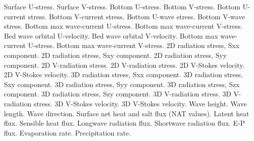 \begin{klist}
\begin{klist}
          Surface U-stress.
          Surface V-stress.
          Bottom U-stress.
          Bottom V-stress.
\vspace{2 mm}
          Bottom U-current stress.
          Bottom V-current stress.
          Bottom U-wave stress.
          Bottom V-wave stress.
          Bottom max wave-current U-stress.
          Bottom max wave-current V-stress.
\vspace{2 mm}
          Bed wave orbital U-velocity.
          Bed wave orbital V-velocity.
          Bottom max wave-current U-stress.
          Bottom max wave-current V-stress.
\vspace{2 mm}
         2D radiation stress, Sxx component.
         2D radiation stress, Sxy component.
         2D radiation stress, Syy component.
         2D V-radiation stress.
         2D V-radiation stress.
         2D V-Stokes velocity.
         2D V-Stokes velocity.
\vspace{2 mm}
         3D radiation stress, Sxx component.
         3D radiation stress, Sxy component.
         3D radiation stress, Syy component.
         3D radiation stress, Szx component.
         3D radiation stress, Szy component.
         3D V-radiation stress.
         3D V-radiation stress.
         3D V-Stokes velocity.
         3D V-Stokes velocity.
\vspace{2 mm}
         Wave height.
         Wave length.
         Wave direction.
\vspace{2 mm}
         Surface net heat and salt flux (NAT values).
         Latent heat flux.
         Sensible heat flux.
         Longwave radiation flux.
         Shortwave radiation flux.
         E-P flux.
         Evaporation rate.
         Precipitation rate.
\vspace{2 mm}

\end{klist}
\end{klist}

